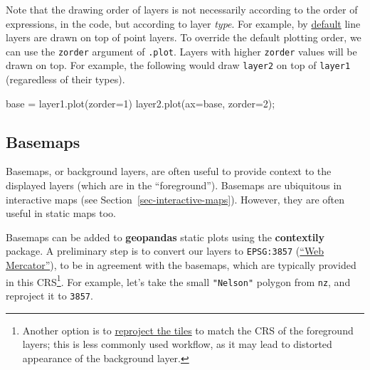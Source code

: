 \documentclass[
  letterpaper,
]{krantz}
\newenvironment{Shaded}{\begin{snugshade}}{\end{snugshade}}
\newcommand{\DecValTok}[1]{\textcolor[rgb]{0.68,0.00,0.00}{#1}}
\newcommand{\NormalTok}[1]{\textcolor[rgb]{0.00,0.23,0.31}{#1}}
\newcommand{\OperatorTok}[1]{\textcolor[rgb]{0.37,0.37,0.37}{#1}}
\begin{document}
\begin{tcolorbox}[enhanced jigsaw, title=\textcolor{quarto-callout-note-color}{\faInfo}\hspace{0.5em}{Note}, coltitle=black, colbacktitle=quarto-callout-note-color!10!white, breakable, titlerule=0mm, colframe=quarto-callout-note-color-frame, opacitybacktitle=0.6, colback=white, bottomrule=.15mm, left=2mm, leftrule=.75mm, toprule=.15mm, toptitle=1mm, bottomtitle=1mm, arc=.35mm, opacityback=0, rightrule=.15mm]

Note that the drawing order of layers is not necessarily according to
the order of expressions, in the code, but according to layer
\emph{type}. For example, by
\href{https://matplotlib.org/stable/gallery/misc/zorder_demo.html}{default}
line layers are drawn on top of point layers. To override the default
plotting order, we can use the \texttt{zorder} argument of
\texttt{.plot}. Layers with higher \texttt{zorder} values will be drawn
on top. For example, the following would draw \texttt{layer2} on top of
\texttt{layer1} (regaredless of their types).

\begin{Shaded}
\begin{Highlighting}[]
\NormalTok{base }\OperatorTok{=}\NormalTok{ layer1.plot(zorder}\OperatorTok{=}\DecValTok{1}\NormalTok{)}
\NormalTok{layer2.plot(ax}\OperatorTok{=}\NormalTok{base, zorder}\OperatorTok{=}\DecValTok{2}\NormalTok{)}\OperatorTok{;}
\end{Highlighting}
\end{Shaded}

\end{tcolorbox}

\subsection{Basemaps}\label{basemaps}

Basemaps, or background layers, are often useful to provide context to
the displayed layers (which are in the ``foreground''). Basemaps are
ubiquitous in interactive maps (see Section~\ref{sec-interactive-maps}).
However, they are often useful in static maps too.

Basemaps can be added to \textbf{geopandas} static plots using the
\textbf{contextily} package. A preliminary step is to convert our layers
to \texttt{EPSG:3857}
(\href{https://en.wikipedia.org/wiki/Web_Mercator_projection}{``Web
Mercator''}), to be in agreement with the basemaps, which are typically
provided in this CRS\footnote{Another option is to
  \href{https://contextily.readthedocs.io/en/latest/warping_guide.html}{reproject
  the tiles} to match the CRS of the foreground layers; this is less
  commonly used workflow, as it may lead to distorted appearance of the
  background layer.}. For example, let's take the small
\texttt{"Nelson"} polygon from \texttt{nz}, and reproject it to
\texttt{3857}.
\end{document}
